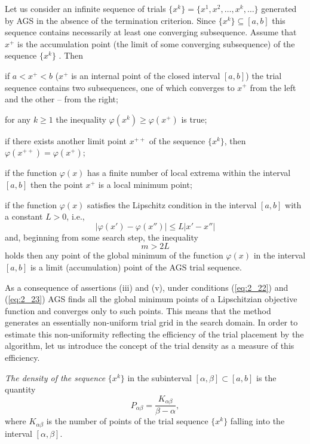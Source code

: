 Let us consider an infinite sequence of trials $\{x^k\}=\{x^1,x^2,\ldots ,x^k,\ldots\}$  generated by AGS in the absence of the termination criterion. Since $\{x^k\}\subseteq [a,b]$  this sequence contains necessarily at least one converging subsequence. Assume that $x^+$  is the accumulation point (the limit of some converging subsequence) of the sequence $\{x^k\}$ . Then
\begin{description}[i)]
\item [i)]{if $a<x^+<b$ ($x^+$ is an internal point of the closed interval $[a,b]$)  the trial sequence contains two subsequences, one of which converges to $x^+$  from the left and the other – from the right;}
\item [ii)]{for any $k\geq 1$  the inequality $\varphi(x^k)\geq \varphi(x^+)$ is true;}
\item [iii)]{if there exists another limit point $x^{++}$  of the sequence $\{x^k\}$, then $\varphi(x^{++})=\varphi(x^+)$;}
\item [iv)]{if the function $\varphi(x)$ has a finite number of local extrema within the interval $[a,b]$ then the point $x^+$ is a local minimum point;}
\item [v)]{if the function $\varphi(x)$ satisfies the Lipschitz condition in the interval $[a,b]$ with a constant $L>0$, i.e.,
\begin{equation}
\label{eq:2_22}
\left|\varphi(x')-\varphi(x'')\right|\leq L\left|x'-x''\right|
\end{equation} 
and, beginning from some search step, the inequality 
\begin{equation}
\label{eq:2_23}
m>2L
\end{equation}
holds then any point of the global minimum of the function $\varphi(x)$ in the interval $[a,b]$ is a limit (accumulation) point of the AGS trial sequence.} 
\end{description}

As a consequence of  assertions (iii) and (v), under conditions (\ref{eq:2_22}) and (\ref{eq:2_23}) AGS finds all the global minimum points of a Lipschitzian objective function and converges only to such points. This means that the method generates an essentially non-uniform trial grid in the search domain. In order to estimate this non-uniformity reflecting the efficiency of the trial placement by the algorithm, let us introduce the concept of the trial density as a measure of this efficiency.
\begin{definition}
\label{def:2_1}
\textit{The density of the sequence} $\{x^k\}$   in the subinterval $[\alpha,\beta]\subset [a,b]$  is the quantity
\begin{displaymath}
P_{\alpha\beta}=\frac{K_{\alpha\beta}}{\beta-\alpha},
\end{displaymath}
where $K_{\alpha\beta}$ is the number of points of the trial sequence $\{x^k\}$  falling into the interval $[\alpha,\beta]$.
\end{definition}

